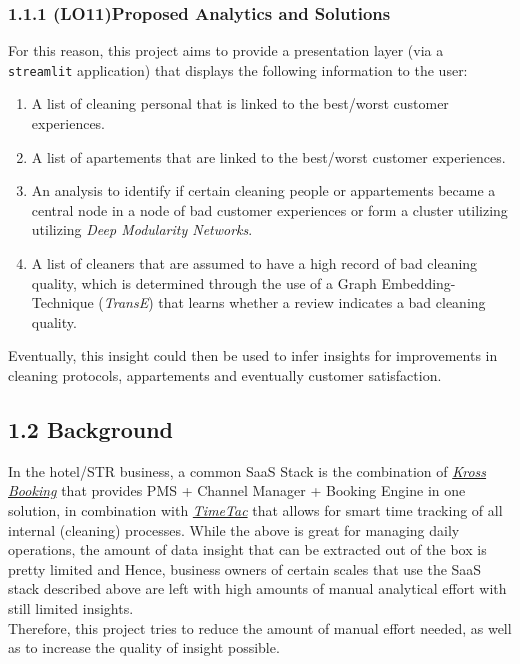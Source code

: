 \documentclass[
]{article}
\begin{document}
\subsubsection{1.1.1 (LO11)Proposed Analytics and
Solutions}\label{proposed-analytics-and-solutions}

For this reason, this project aims to provide a presentation layer (via
a \texttt{streamlit} application) that displays the following
information to the user: 

\begin{enumerate}
  \item A list of cleaning personal that is linked to the best/worst customer experiences.  
  \item A list of apartements that are linked to the best/worst customer experiences. 
  \item An analysis to identify if certain cleaning people or appartements became a central node in a node of bad customer experiences or form a cluster utilizing utilizing \emph{Deep Modularity Networks}.
  \item A list of cleaners that are assumed to have a high record of bad cleaning quality, which is determined through the use of a Graph Embedding-Technique (\emph{TransE}) that learns whether a review indicates a bad cleaning quality.
  
\end{enumerate}
 
Eventually, this insight could then be used to infer insights for
improvements in cleaning protocols, appartements and eventually customer
satisfaction.

\subsection{1.2 Background}\label{background}

In the hotel/STR business, a common SaaS Stack is the combination of
\href{https://www.krossbooking.com/en}{\textit{Kross Booking}} that provides PMS
+ Channel Manager + Booking Engine in one solution, in combination with
\href{https://www.timetac.com/en/}{\textit{TimeTac}} that allows for smart time
tracking of all internal (cleaning) processes. While the above is great
for managing daily operations, the amount of data insight that can be
extracted out of the box is pretty limited and Hence, business owners of
certain scales that use the SaaS stack described above are left with
high amounts of manual analytical effort with still limited insights.\\
Therefore, this project tries to reduce the amount of manual effort
needed, as well as to increase the quality of insight possible.
\end{document}

